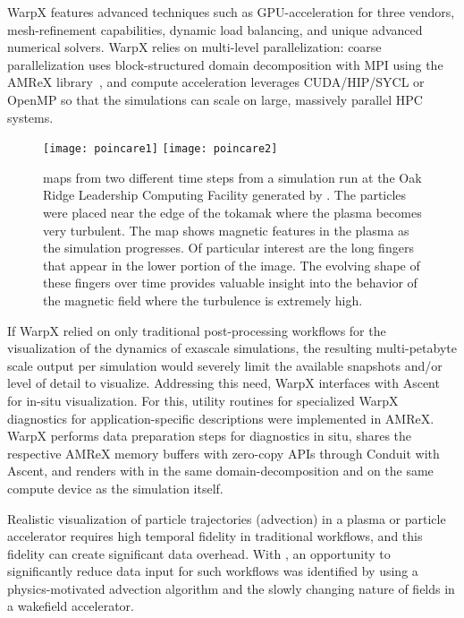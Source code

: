 WarpX features advanced techniques such as GPU-acceleration for three vendors, mesh-refinement capabilities, dynamic load balancing, and unique advanced numerical solvers.
WarpX relies on multi-level parallelization: coarse parallelization uses block-structured domain decomposition with MPI using the AMReX library~\citep{Zhang2019}, and compute acceleration leverages CUDA/HIP/SYCL or OpenMP so that the simulations can scale on large, massively parallel HPC systems.

\begin{figure*}[b]
  \centering
  \texttt{[image: poincare1]}
  \texttt{[image: poincare2]}
  \caption{\poincare maps from two different time steps from a simulation run at the Oak Ridge Leadership Computing Facility generated by \vtkm.  The particles were placed near the edge of the tokamak where the plasma becomes very turbulent. The \poincare map shows magnetic features in the plasma as the simulation progresses. Of particular interest are the long fingers that appear in the lower portion of the image. The evolving shape of these fingers over time provides valuable insight into the behavior of the magnetic field where the turbulence is extremely high. }
  \label{fig:poincare}
\end{figure*}

If WarpX relied on only traditional post-processing workflows for the visualization of the dynamics of exascale simulations, the resulting multi-petabyte scale output per simulation would severely limit the available snapshots and/or level of detail to visualize.
Addressing this need, WarpX interfaces with Ascent for in-situ visualization.
For this, utility routines for specialized WarpX diagnostics for application-specific descriptions were implemented in AMReX.
WarpX performs data preparation steps for diagnostics in situ, shares the respective AMReX memory buffers with zero-copy APIs through Conduit with Ascent, and renders with \vtkm in the same domain-decomposition and on the same compute device as the simulation itself.

Realistic visualization of particle trajectories (advection) in a plasma or particle accelerator requires high temporal fidelity in traditional workflows, and this fidelity can create significant data overhead.
With \vtkm, an opportunity to significantly reduce data input for such workflows was identified by using a physics-motivated advection algorithm and the slowly changing nature of fields in a wakefield accelerator.

